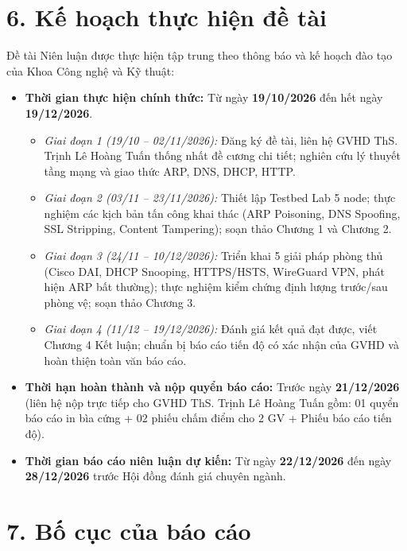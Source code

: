 \section*{6. Kế hoạch thực hiện đề tài}

Đề tài Niên luận được thực hiện tập trung theo thông báo và kế hoạch đào tạo của Khoa Công nghệ và Kỹ thuật:
\begin{itemize}
  \item \textbf{Thời gian thực hiện chính thức:} Từ ngày \textbf{19/10/2026} đến hết ngày \textbf{19/12/2026}.
    \begin{itemize}
      \item \textit{Giai đoạn 1 (19/10 -- 02/11/2026):} Đăng ký đề tài, liên hệ GVHD ThS. Trịnh Lê Hoàng Tuấn thống nhất đề cương chi tiết; nghiên cứu lý thuyết tầng mạng và giao thức ARP, DNS, DHCP, HTTP.
      \item \textit{Giai đoạn 2 (03/11 -- 23/11/2026):} Thiết lập Testbed Lab 5 node; thực nghiệm các kịch bản tấn công khai thác (ARP Poisoning, DNS Spoofing, SSL Stripping, Content Tampering); soạn thảo Chương 1 và Chương 2.
      \item \textit{Giai đoạn 3 (24/11 -- 10/12/2026):} Triển khai 5 giải pháp phòng thủ (Cisco DAI, DHCP Snooping, HTTPS/HSTS, WireGuard VPN, phát hiện ARP bất thường); thực nghiệm kiểm chứng định lượng trước/sau phòng vệ; soạn thảo Chương 3.
      \item \textit{Giai đoạn 4 (11/12 -- 19/12/2026):} Đánh giá kết quả đạt được, viết Chương 4 Kết luận; chuẩn bị báo cáo tiến độ có xác nhận của GVHD và hoàn thiện toàn văn báo cáo.
    \end{itemize}
  \item \textbf{Thời hạn hoàn thành và nộp quyển báo cáo:} Trước ngày \textbf{21/12/2026} (liên hệ nộp trực tiếp cho GVHD ThS. Trịnh Lê Hoàng Tuấn gồm: 01 quyển báo cáo in bìa cứng + 02 phiếu chấm điểm cho 2 GV + Phiếu báo cáo tiến độ).
  \item \textbf{Thời gian báo cáo niên luận dự kiến:} Từ ngày \textbf{22/12/2026} đến ngày \textbf{28/12/2026} trước Hội đồng đánh giá chuyên ngành.
\end{itemize}

\section*{7. Bố cục của báo cáo}

